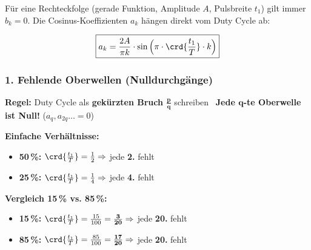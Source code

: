 Für eine Rechteckfolge (gerade Funktion, Amplitude $A$, Pulsbreite $t_1$) gilt immer $b_k = 0$. Die Cosinus-Koeffizienten $a_k$ hängen direkt vom Duty Cycle  ab:

$$ \boxed{ a_k = \frac{2A}{\pi k} \cdot \sin \Big( \pi \cdot \crd{\frac{t_1}{T}} \cdot k \Big) } $$

\subsubsection{1. Fehlende Oberwellen (Nulldurchgänge)}
\textbf{Regel:} Duty Cycle als \textbf{gekürzten Bruch $\bm{\frac{p}{q}}$} schreiben \textrightarrow\ \textbf{Jede $\bm{q}$-te Oberwelle ist Null!} ($a_{q}, a_{2q} \dots = 0$)

\vspace{0.2cm}
\begin{minipage}[t]{0.45\columnwidth}
    \textbf{Einfache Verhältnisse:}
    \begin{itemize}
        \item \textbf{50\,\%:} $\crd{\frac{t_1}{T}} = \frac{1}{2} \Rightarrow$ jede \textbf{2.} fehlt
        \item \textbf{25\,\%:} $\crd{\frac{t_1}{T}} = \frac{1}{4} \Rightarrow$ jede \textbf{4.} fehlt
    \end{itemize}
\end{minipage}
\hfill
\begin{minipage}[t]{0.48\columnwidth}
    \textbf{Vergleich 15\,\% vs. 85\,\%:}
    \begin{itemize}
        \item \textbf{15\,\%:} $\crd{\frac{t_1}{T}} = \frac{15}{100} = \mathbf{\frac{3}{20}} \Rightarrow$ jede \textbf{20.} fehlt
        \item \textbf{85\,\%:} $\crd{\frac{t_1}{T}} = \frac{85}{100} = \mathbf{\frac{17}{20}} \Rightarrow$ jede \textbf{20.} fehlt
    \end{itemize}
\end{minipage}

\vspace{0.3cm}
\begin{center}
\end{center}


